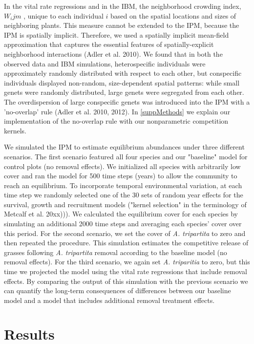 \documentclass[11pt]{article}
\begin{document}
\begin{doublespacing}
In the vital rate regressions and in the IBM, the neighborhood crowding index, $W_ijm$ , unique to each individual $i$ based on the spatial locations and sizes of neighboring plants. This measure cannot be extended to the IPM, because the IPM is spatially implicit. Therefore, we used a spatially
implicit mean-field approximation that captures the essential features of spatially-explicit neighborhood interactions (Adler et al. 2010). We found that in both the observed data and IBM simulations, heterospecific individuals were approximately randomly distributed with respect to each other, 
but conspecific individuals displayed non-random, size-dependent spatial patterns: while small genets were randomly distributed, large genets 
were segregated from each other. The overdispersion of large conspecific genets was introduced into the IPM with a 'no-overlap' rule (Adler et al. 2010, 2012). In \ref{suppMethods} we explain our implementation of the no-overlap rule with our nonparametric competition kernels. 

We simulated the IPM to estimate equilibrium abundances under three different scenarios. The first scenario featured all four species and our "baseline" model for control plots (no removal effects). We initialized all species with arbitrarily low cover and ran the model for 500 time steps (years) to allow the community to reach an equilibrium. To incorporate temporal environmental variation, at each time step we randomly selected one of the 30 sets of random year effects for the survival, growth and recruitment models ("kernel selection" in the terminology of Metcalf et al. 20xx))). We calculated the equilibrium cover for each species by simulating an additional 2000 time steps and averaging each species' cover over this period. For the second scenario, we set the cover of \textit{A. tripartita} to zero and then repeated the procedure. This simulation estimates the competitive release of grasses following \textit{A. tripartita} removal according to the baseline model (no removal effects). For the third scenario, we again set  \textit{A. triparitia} to zero, but this time we projected the model using the vital rate regressions that include removal effects. By comparing the output of this simulation with the previous scenario we can quantify the long-term consequences of differences between our baseline model and a model that includes additional removal treatment effects.  

\section*{Results}


\end{doublespacing}
\end{document}
